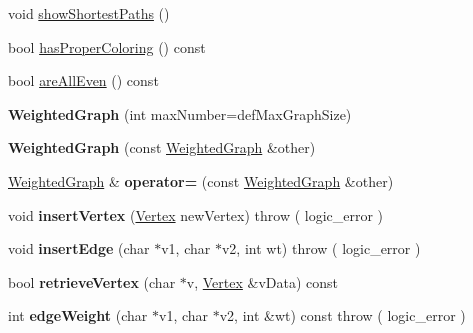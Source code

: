 \begin{DoxyCompactItemize}
\item 
void \hyperlink{class_weighted_graph_a8e6ea9adc87345052786eec67a5f9164}{show\+Shortest\+Paths} ()
\item 
bool \hyperlink{class_weighted_graph_a60be8bab10a9142846093cb768855efd}{has\+Proper\+Coloring} () const 
\item 
bool \hyperlink{class_weighted_graph_a03884e32b9e093b10e3a44add7eaa928}{are\+All\+Even} () const 
\item 
{\bfseries Weighted\+Graph} (int max\+Number=def\+Max\+Graph\+Size)\hypertarget{class_weighted_graph_acf8f5b4f212bc8daf4b12f0b88899180}{}\label{class_weighted_graph_acf8f5b4f212bc8daf4b12f0b88899180}

\item 
{\bfseries Weighted\+Graph} (const \hyperlink{class_weighted_graph}{Weighted\+Graph} \&other)\hypertarget{class_weighted_graph_a294fd717db213e761dc0eb65bbfcb7ab}{}\label{class_weighted_graph_a294fd717db213e761dc0eb65bbfcb7ab}

\item 
\hyperlink{class_weighted_graph}{Weighted\+Graph} \& {\bfseries operator=} (const \hyperlink{class_weighted_graph}{Weighted\+Graph} \&other)\hypertarget{class_weighted_graph_a32c3057c0f746f427068be4a9b408845}{}\label{class_weighted_graph_a32c3057c0f746f427068be4a9b408845}

\item 
void {\bfseries insert\+Vertex} (\hyperlink{class_weighted_graph_1_1_vertex}{Vertex} new\+Vertex)  throw ( logic\+\_\+error )\hypertarget{class_weighted_graph_a164845f6fecf25a25f5f14f69d42d975}{}\label{class_weighted_graph_a164845f6fecf25a25f5f14f69d42d975}

\item 
void {\bfseries insert\+Edge} (char $\ast$v1, char $\ast$v2, int wt)  throw ( logic\+\_\+error )\hypertarget{class_weighted_graph_ad5e4bb96c2b3b5ace4be251bb3b47621}{}\label{class_weighted_graph_ad5e4bb96c2b3b5ace4be251bb3b47621}

\item 
bool {\bfseries retrieve\+Vertex} (char $\ast$v, \hyperlink{class_weighted_graph_1_1_vertex}{Vertex} \&v\+Data) const \hypertarget{class_weighted_graph_add447f0f2354c8c776045bf3bec865d8}{}\label{class_weighted_graph_add447f0f2354c8c776045bf3bec865d8}

\item 
int {\bfseries edge\+Weight} (char $\ast$v1, char $\ast$v2, int \&wt) const   throw ( logic\+\_\+error )\hypertarget{class_weighted_graph_a80b2b095e7a05df4841383d2067e4345}{}\label{class_weighted_graph_a80b2b095e7a05df4841383d2067e4345}


\end{DoxyCompactItemize}
